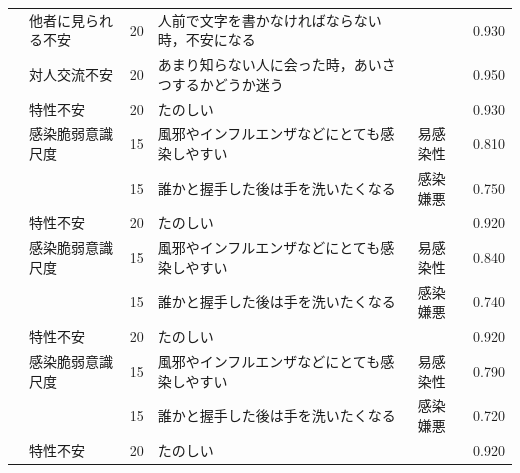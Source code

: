 \begin{landscape}
\begin{longtable}{p{2cm}p{2cm}p{2cm}p{6cm}p{2cm}p{2cm}}
		                         & 他者に見られる不安                        & 20  & 人前で文字を書かなければならない時，不安になる                             &                      & 0.930      \\
		                         & 対人交流不安                           & 20  & あまり知らない人に会った時，あいさつするかどうか迷う                          &                      & 0.950      \\
		                         & 特性不安                             & 20  & たのしい                                                &                      & 0.930      \\
		                         & 感染脆弱意識尺度                         & 15  & 風邪やインフルエンザなどにとても感染しやすい                              & 易感染性                 & 0.810      \\
		                         &                                  & 15  & 誰かと握手した後は手を洗いたくなる                                   & 感染嫌悪                 & 0.750      \\
		                         & 特性不安                             & 20  & たのしい                                                &                      & 0.920      \\
		                         & 感染脆弱意識尺度                         & 15  & 風邪やインフルエンザなどにとても感染しやすい                              & 易感染性                 & 0.840      \\
		                         &                                  & 15  & 誰かと握手した後は手を洗いたくなる                                   & 感染嫌悪                 & 0.740      \\
		                         & 特性不安                             & 20  & たのしい                                                &                      & 0.920      \\
		                         & 感染脆弱意識尺度                         & 15  & 風邪やインフルエンザなどにとても感染しやすい                              & 易感染性                 & 0.790      \\
		                         &                                  & 15  & 誰かと握手した後は手を洗いたくなる                                   & 感染嫌悪                 & 0.720      \\
		                         & 特性不安                             & 20  & たのしい                                                &                      & 0.920      \\

\end{longtable}
\end{landscape}
